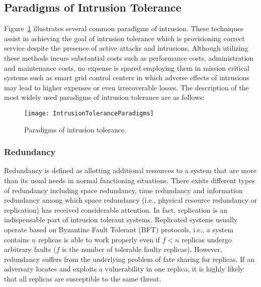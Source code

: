 \documentclass[preprint,number,12pt]{elsarticle}
\begin{document}
\subsection{Paradigms of Intrusion Tolerance}
Figure~\ref{fig:IntrusionToleranceParadigms} illustrates several common paradigms of intrusion. These techniques assist in achieving the goal of intrusion tolerance which is provisioning correct service despite the presence of active attacks and intrusions. Although utilizing these methods incurs substantial costs such as performance costs, administration and maintenance costs, no expense is spared employing them in mission critical systems such as smart grid control centers in which adverse effects of intrusions may lead to higher expenses or even irrecoverable losses. The description of the most widely used paradigms of intrusion tolerance are as follows:
\begin{figure}[!t]
\centering
\texttt{[image: IntrusionToleranceParadigms]}
\caption{Paradigms of intrusion tolerance.}
\label{fig:IntrusionToleranceParadigms}
\end{figure}
\subsubsection{Redundancy}
Redundancy is defined as allotting additional resources to a system that are more than its usual needs in normal functioning situations. There exists different types of redundancy including space redundancy, time redundancy and information redundancy among which space redundancy (i.e., physical resource redundancy or replication) has received considerable attention. In fact, replication is an indispensable part of intrusion tolerant systems. Replicated systems usually operate based on Byzantine Fault Tolerant (BFT) protocols, i.e., a system contains $n$ replicas is able to work properly even if $f<n$ replicas undergo arbitrary faults ($f$ is the number of tolerable faulty replicas)\citep{Bessani2011a}. However, redundancy suffers from the underlying problem of fate sharing for replicas\citep{Sterbenz20101245,Wang2003b}. If an adversary locates and exploits a vulnerability in one replica, it is highly likely that all replicas are susceptible to the same threat.
\end{document}
